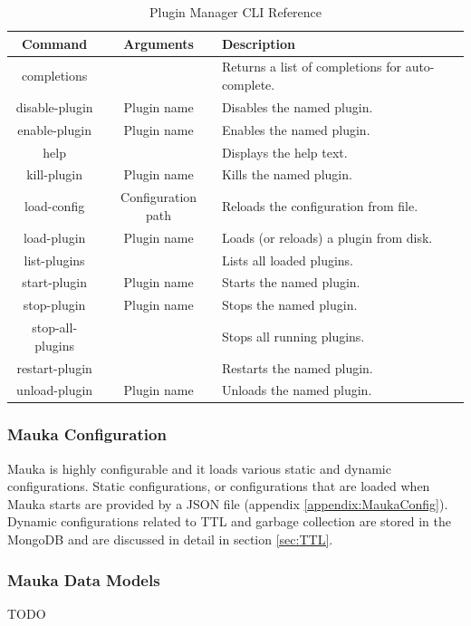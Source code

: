 \begin{table}[H]
	\centering
	\caption{Plugin Manager CLI Reference}
	\begin{tabular}{|c|c|p{8cm}|}
		\hline 
		Command & Arguments & Description \\ 
		\hline
		completions & & Returns a list of completions for auto-complete. \\
		\hline
		disable-plugin & Plugin name & Disables the named plugin. \\
		\hline
		enable-plugin & Plugin name & Enables the named plugin. \\
		\hline
		help & & Displays the help text. \\
		\hline
		kill-plugin & Plugin name & Kills the named plugin. \\
		\hline
		load-config & Configuration path & Reloads the configuration from file. \\
		\hline 
		load-plugin & Plugin name & Loads (or reloads) a plugin from disk. \\
		\hline 
		list-plugins & & Lists all loaded plugins. \\
		\hline
		start-plugin & Plugin name & Starts the named plugin. \\
		\hline 
		stop-plugin & Plugin name & Stops the named plugin. \\
		\hline
		stop-all-plugins & & Stops all running plugins. \\
		\hline
		restart-plugin & & Restarts the named plugin. \\
		\hline
		unload-plugin & Plugin name & Unloads the named plugin. \\
		\hline
	\end{tabular} 
	\label{table:PluginManager}
\end{table}

\subsubsection{Mauka Configuration}
Mauka is highly configurable and it loads various static and dynamic configurations. Static configurations, or configurations that are loaded when Mauka starts are provided by a JSON file (appendix \ref{appendix:MaukaConfig}). Dynamic configurations related to TTL and garbage collection are stored in the MongoDB and are discussed in detail in section \ref{sec:TTL}.

\subsubsection{Mauka Data Models}
TODO

